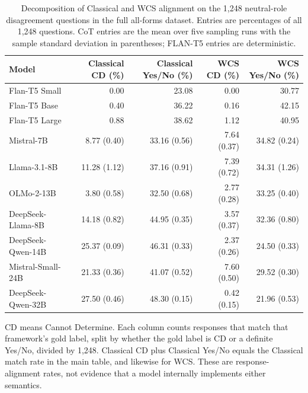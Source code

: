 \begin{table}[htbp]
\centering
\scriptsize
\setlength{\tabcolsep}{4pt}
\caption{Decomposition of Classical and WCS alignment on the 1,248 neutral-role disagreement questions in the full all-forms dataset. Entries are percentages of all 1,248 questions. CoT entries are the mean over five sampling runs with the sample standard deviation in parentheses; FLAN-T5 entries are deterministic.}
\label{tab:alignment-decomposition-final2}
\begin{tabular}{lrrrr}
\toprule
Model & Classical CD (\%) & Classical Yes/No (\%) & WCS CD (\%) & WCS Yes/No (\%) \\
\midrule
Flan-T5 Small & 0.00 & 23.08 & 0.00 & 30.77 \\
Flan-T5 Base & 0.40 & 36.22 & 0.16 & 42.15 \\
Flan-T5 Large & 0.88 & 38.62 & 1.12 & 40.95 \\
Mistral-7B & 8.77 (0.40) & 33.16 (0.56) & 7.64 (0.37) & 34.82 (0.24) \\
Llama-3.1-8B & 11.28 (1.12) & 37.16 (0.91) & 7.39 (0.72) & 34.31 (1.26) \\
OLMo-2-13B & 3.80 (0.58) & 32.50 (0.68) & 2.77 (0.28) & 33.25 (0.40) \\
DeepSeek-Llama-8B & 14.18 (0.82) & 44.95 (0.35) & 3.57 (0.37) & 32.36 (0.80) \\
DeepSeek-Qwen-14B & 25.37 (0.09) & 46.31 (0.33) & 2.37 (0.26) & 24.50 (0.33) \\
Mistral-Small-24B & 21.33 (0.36) & 41.07 (0.52) & 7.60 (0.50) & 29.52 (0.30) \\
DeepSeek-Qwen-32B & 27.50 (0.46) & 48.30 (0.15) & 0.42 (0.15) & 21.96 (0.53) \\
\bottomrule
\end{tabular}
\vspace{2pt}
\begin{minipage}{\linewidth}
\scriptsize CD means Cannot Determine. Each column counts responses that match that framework's gold label, split by whether the gold label is CD or a definite Yes/No, divided by 1,248. Classical CD plus Classical Yes/No equals the Classical match rate in the main table, and likewise for WCS. These are response-alignment rates, not evidence that a model internally implements either semantics.
\end{minipage}
\end{table}
